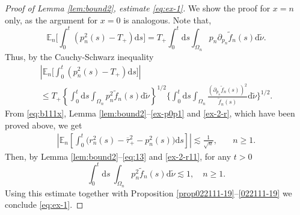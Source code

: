 \documentclass[EJP]{ejpecp} %
\newcommand\Om{\Omega}
\renewcommand{\ge}{\geqslant}
\renewcommand{\le}{\leqslant}
\newcommand{\dd  }{\mathrm{d}}
\renewcommand{\tilde}{\widetilde}
\renewcommand{\bar}{\overline}
\numberwithin{equation}{section}
\begin{document}
\begin{proof}[Proof of Lemma \ref{lem:bound2}, estimate \eqref{eq:ex-1}]
We show the proof for $x=n$ only, as the argument for $x=0$ is analogous.   Note that, 
  \begin{equation*}
     \mathbb{E}_n\bigg[   \int_0^t  \left(p_{n}^2(s) - T_+\right)\dd s\bigg] 
=
      T_+  \int_0^t  \dd s \int_{\Om_n} p_{n} \partial_{p_n}\tilde  f_n(s) \dd\tilde \nu.
  \end{equation*}
Thus, by the Cauchy-Schwarz inequality
\begin{multline}
  \left|\mathbb{E}_n\bigg[   \int_0^t  \left(p_{n}^2(s) - T_+\right)\dd s\bigg]\right|
 \\  \le T_+ \left\{ \int_0^t  \dd s \int_{\Om_n} p_{n}^2 \tilde f_n(s) \dd\tilde \nu \right\}^{1/2}
      \bigg\{ \int_0^t  \dd s \int_{\Om_n}  \frac{\left( \partial_{p_n}\tilde  f_n(s) \right)^2}{\tilde f_n(s)} \dd\tilde \nu \bigg\}^{1/2}.
    \label{eq:7x}
\end{multline}
From \eqref{eq:b111x}, Lemma \ref{lem:bound2}--\eqref{ex-p0p1} and \eqref{ex-2-r}, which have been proved above, we 
 get
\begin{align}   
 \left|\mathbb{E}_n\left[ \int_0^t \Big(r_n^2(s)-\bar\tau_+^2-p_n^2(s)\Big)\dd s\right] \right|\lesssim
    \frac{1}{\sqrt{n}}, & \quad n\ge 1. \label{ex-2-r11}
\end{align}
Then, by Lemma \ref{lem:bound2}--\eqref{eq:13} and \eqref{ex-2-r11}, for any $t>0$ 
  \begin{equation}\label{eq:p2b}
  \int_0^t \dd s\ \int_{\Om_n}  p_{n}^2 \tilde f_n(s) \dd\tilde \nu \lesssim 1,\quad n\ge1.
  \end{equation}
 Using this estimate together with  Proposition \ref{prop022111-19}--\eqref{022111-19}
  we
 conclude \eqref{eq:ex-1}.
\end{proof}
\end{document}
